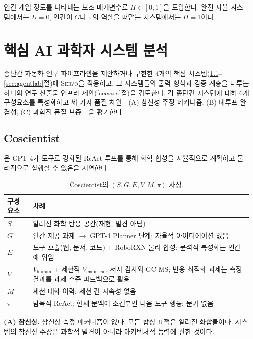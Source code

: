 \documentclass[11pt]{article}
\newcommand{\sgmvpi}{$(S, G, E, V, M, \pi)$}
\newcommand{\framework}{\textsc{Servo}}
\begin{document}
인간 개입 정도를 나타내는 보조 매개변수로 $H \in [0,1]$을 도입한다. 완전 자율 시스템에서는 $H=0$, 인간이 $G$나 $\pi$의 역할을 떠맡는 시스템에서는 $H=1$이다.

\section{핵심 AI 과학자 시스템 분석}
\label{sec:core}

종단간 자동화 연구 파이프라인을 제안하거나 구현한 4개의 핵심 시스템(\ref{sec:coscientist}--\ref{sec:agentlab}절)에 \framework{}을 적용하고, 그 시스템들의 출력 형식과 검증 계층을 다루는 하나의 연구 산출물 인프라 제안(\ref{sec:ara}절)을 검토한다. 각 종단간 시스템에 대해 6개 구성요소를 특성화하고 세 가지 품질 차원---(A) 참신성 주장 메커니즘, (B) 폐루프 완결성, (C) 과학적 품질 보증---을 평가한다.

\subsection{Coscientist}
\label{sec:coscientist}

\citet{boiko2023emergent}은 GPT-4가 도구로 강화된 ReAct 루프를 통해 화학 합성을 자율적으로 계획하고 물리적으로 실행할 수 있음을 시연한다.

\begin{table}[h]
\centering
\small
\begin{tabular}{@{}lp{9cm}@{}}
\toprule
구성요소 & 사례 \\
\midrule
$S$ & 알려진 화학 반응 공간(재현, 발견 아님) \\
$G$ & 인간 제공 과제 $\rightarrow$ GPT-4 Planner 단계; 자율적 아이디에이션 없음 \\
$E$ & 도구 호출(웹, 문서, 코드) + RoboRXN 물리 합성; 분석적 특성화는 인간에 위임 \\
$V$ & $V_\text{human}$ + 제한적 $V_\text{empirical}$: 저자 검사와 GC-MS; 반응 최적화 과제는 측정 결과를 과제 수준 피드백으로 활용 \\
$M$ & 세션 대화 이력; 세션 간 지속성 없음 \\
$\pi$ & 탐욕적 ReAct: 현재 문맥에 조건부인 다음 도구 행동; 분기 없음 \\
\bottomrule
\end{tabular}
\caption{Coscientist의 \sgmvpi{} 사상.}
\end{table}

\noindent\textbf{(A) 참신성.} 참신성 측정 메커니즘이 없다. 모든 합성 표적은 알려진 화합물이다. 시스템의 참신성 주장은 과학적 발견이 아니라 아키텍처적 능력에 관한 것이다.
\end{document}
